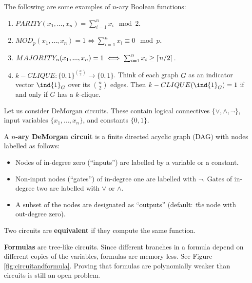 \documentclass[11pt]{article}
\begin{document}
	\begin{example}
		The following are some examples of $n$-ary Boolean functions:
		\begin{enumerate}
			\item $PARITY(x_1, ..., x_n) = \sum_{i = 1}^{n} x_i \mod 2$.
			\item $MOD_p(x_1, ..., x_n) = 1 \iff \sum_{i = 1}^{n} x_i \equiv 0 \mod p$.
			\item $MAJORITY_n(x_1, ..., x_n) = 1 \iff \sum_{i=1}^{n} x_i \geq \lceil n/2\rceil$.
			\item $k-CLIQUE: \{0,1\}^{\binom{n}{2}} \rightarrow \{0,1\}$. Think of each graph $G$ as an indicator vector $\ind{1}_G$ over its $\binom{n}{2}$ edges. Then $k-CLIQUE(\ind{1}_G) = 1$ if and only if $G$ has a $k$-clique.
		\end{enumerate}
	\end{example}
	
	Let us consider DeMorgan circuits. These contain logical connectives $\{\lor, \land, \lnot\}$, input variables $\{x_1, ..., x_n\}$, and constants $\{0,1\}$. 
	
	\begin{definition}
		\label{def:demorgancircuit}
		A \textbf{$n$-ary DeMorgan circuit} is a finite directed acyclic graph (DAG) with nodes labelled as follows:
		\begin{itemize}
			\item Nodes of in-degree zero (``inputs'') are labelled by a variable or a constant.
			\item Non-input nodes (``gates'') of in-degree one are labelled with $\lnot$. Gates of in-degree two are labelled with $\lor$ or $\land$.
			\item A subset of the nodes are designated as ``outputs'' (default: \emph{the} node with out-degree zero).
		\end{itemize}
		Two circuits are \textbf{equivalent} if they compute the same function.
	\end{definition}
	
	\textbf{Formulas} are tree-like circuits. Since different branches in a formula depend on different copies of the variables, formulas are memory-less. See Figure \ref{fig:circuitandformula}. Proving that formulas are polynomially weaker than circuits is still an open problem.
	
\end{document}
